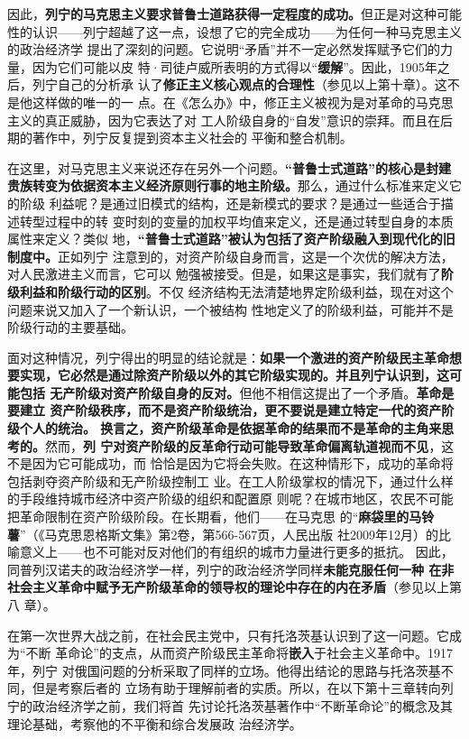 因此，\textbf{列宁的马克思主义要求普鲁士道路获得一定程度的成功。}但正是对这种可能
性的认识——列宁超越了这一点，设想了它的完全成功——为任何一种马克思主义的政治经济学
提出了深刻的问题。它说明“矛盾”并不一定必然发挥赋予它们的力量，因为它们可能以皮
特·司徒卢威所表明的方式得以“\textbf{缓解}”。因此，1905年之后，列宁自己的分析承
认了\textbf{修正主义核心观点的合理性}（参见以上第十章）。这不是他这样做的唯一的一
点。在《怎么办》中，修正主义被视为是对革命的马克思主义的真正威胁，因为它表达了对
工人阶级自身的“自发”意识的崇拜。而且在后期的著作中，列宁反复提到资本主义社会的
平衡和整合机制。

在这里，对马克思主义来说还存在另外一个问题。\textbf{“普鲁士式道路”的核心是封建
  贵族转变为依据资本主义经济原则行事的地主阶级。}那么，通过什么标准来定义它的阶级
利益呢？是通过旧模式的结构，还是新模式的要求？是通过一些适合于描述转型过程中的转
变时刻的变量的加权平均值来定义，还是通过转型自身的本质属性来定义？类似
地，\textbf{“普鲁士式道路”被认为包括了资产阶级融入到现代化的旧制度中。}正如列宁
注意到的，对资产阶级自身而言，这是一个次优的解决方法，对人民激进主义而言，它可以
勉强被接受。但是，如果这是事实，我们就有了\textbf{阶级利益和阶级行动的区别}。不仅
经济结构无法清楚地界定阶级利益，现在对这个问题来说又加入了一个新认识，一个被结构
性地定义了的阶级利益，可能并不是阶级行动的主要基础。

面对这种情况，列宁得出的明显的结论就是：\textbf{如果一个激进的资产阶级民主革命想
  要实现，它必然是通过除资产阶级以外的其它阶级实现的。并且列宁认识到，这可能包括
  无产阶级对资产阶级自身的反对。}但他不相信这提出了一个矛盾。\textbf{革命是要建立
  资产阶级秩序，而不是资产阶级统治，更不要说是建立特定一代的资产阶级个人的统治。
  换言之，资产阶级革命是依据革命的结果而不是革命的主角来思考的。}然而，\textbf{列
  宁对资产阶级的反革命行动可能导致革命偏离轨道视而不见}，这不是因为它可能成功，而
恰恰是因为它将会失败。在这种情形下，成功的革命将包括剥夺资产阶级和无产阶级控制工
业。在工人阶级掌权的情况下，通过什么样的手段维持城市经济中资产阶级的组织和配置原
则呢？在城市地区，农民不可能把革命限制在资产阶级阶段。在长期看，他们——在马克思
的“\textbf{麻袋里的马铃薯}”（《马克思恩格斯文集》第2卷，第566-567页，人民出版
社2009年12月）的比喻意义上——也不可能对反对他们的有组织的城市力量进行更多的抵抗。
因此，同普列汉诺夫的政治经济学一样，列宁的政治经济学同样\textbf{未能克服任何一种
  在非社会主义革命中赋予无产阶级革命的领导权的理论中存在的内在矛盾}（参见以上第八
章）。

在第一次世界大战之前，在社会民主党中，只有托洛茨基认识到了这一问题。它成为“不断
革命论”的支点，从而资产阶级民主革命将\textbf{嵌入}于社会主义革命中。1917年，列宁
对俄国问题的分析采取了同样的立场。他得出结论的思路与托洛茨基不同，但是考察后者的
立场有助于理解前者的实质。所以，在以下第十三章转向列宁的政治经济学之前，我们将首
先讨论托洛茨基著作中“不断革命论”的概念及其理论基础，考察他的不平衡和综合发展政
治经济学。



